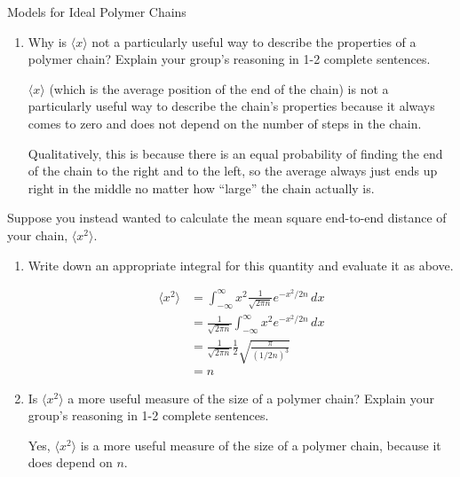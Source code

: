 \begin{activity}{Models for Ideal Polymer Chains}
\begin{ctqs}
\begin{enumerate}
			\item Why is $\langle x \rangle$ not a particularly useful way to describe the properties of a polymer chain?  Explain your group's reasoning in 1-2 complete sentences.
				
				\begin{solution}[1.5in]
					$\langle x \rangle$ (which is the average position of the end of the chain) is not a particularly useful way to describe the chain's properties because it always comes to zero and does not depend on the number of steps in the chain.  
					
					Qualitatively, this is because there is an equal probability of finding the end of the chain to the right and to the left, so the average always just ends up right in the middle no matter how ``large'' the chain actually is.
				\end{solution}
			
		\end{enumerate}
		
	\question Suppose you instead wanted to calculate the mean square end-to-end distance of your chain, $\langle x^2\rangle$.
	
		\begin{enumerate}
			\item Write down an appropriate integral for this quantity and evaluate it as above.
				
				\begin{solution}[1.5in]
					\begin{align*}
						\langle x^2 \rangle &= \int_{-\infty}^\infty x^2 \frac{1}{\sqrt{2\pi n}}e^{-x^2/2n}\, dx\\
						&= \frac{1}{\sqrt{2\pi n}} \int_{-\infty}^\infty x^2 e^{-x^2/2n}\, dx\\
						&= \frac{1}{\sqrt{2\pi n}} \frac{1}{2}\sqrt{\frac{\pi}{(1/2n)^3}}\\
						&= n
					\end{align*}
				\end{solution}
			
			\item Is $\langle x^2 \rangle$ a more useful measure of the size of a polymer chain?  Explain your group's reasoning in 1-2 complete sentences.
				
				\begin{solution}[1.5in]
				
					Yes, $\langle x^2 \rangle$ is a more useful measure of the size of a polymer chain, because it does depend on $n$.
					

\end{solution}
\end{enumerate}
\end{ctqs}
\end{activity}
